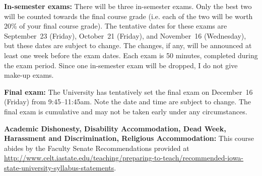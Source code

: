 \documentclass[10pt]{article}
\newcommand{\sep}{\vspace*{0.4cm}}
\newcommand{\tab}{\hspace*{0.8cm}}
\begin{document}
\tab \textbf{In-semester exams:}
There will be three in-semester exams. Only the best two will be counted towards the final course grade (i.e. each of the two will be worth 20\% of your final course grade).
The tentative dates for these exams are September~23 (Friday), October~21
(Friday), and November~16 (Wednesday), but these dates are subject to change. 
The changes, if any, will be announced at least one week before the exam dates.
Each exam is 50 minutes, completed during the exam period.
Since one in-semester exam will be dropped, I do not give make-up exams.
\sep

\tab \textbf{Final exam:}
The University has tentatively set the final exam on December~16 (Friday)
from 9:45--11:45am. Note the date and time are subject to change.
The final exam is cumulative and may not be taken early under any circumstances.
\sep

\tab \textbf{Academic Dishonesty, Disability Accommodation, Dead Week, Harassment and Discrimination, Religious Accommodation:} This course abides by the Faculty Senate Recommendations provided at \url{http://www.celt.iastate.edu/teaching/preparing-to-teach/recommended-iowa-state-university-syllabus-statements}.
\end{document}
